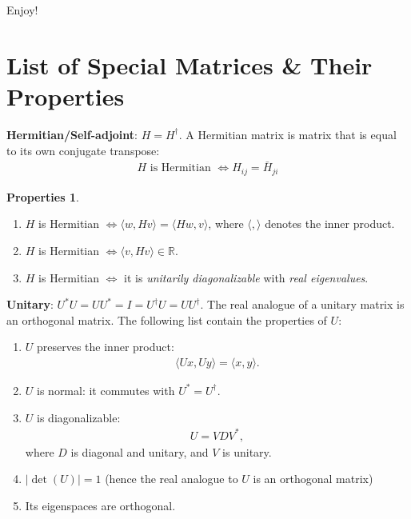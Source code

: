 \documentclass{article}
\theoremstyle{definition}
\newtheorem{prop}{Properties}[section]
\newcommand{\R}{\mathbb{R}}
\begin{document}
Enjoy!


\newpage
\tableofcontents
\newpage

\section{List of Special Matrices \& Their Properties}
\begin{enumerate}
	\item \textbf{Hermitian/Self-adjoint}: $H = H^\dagger$. A Hermitian matrix is matrix that is equal to its own conjugate transpose:
	\begin{align*}
	H \text{ is Hermitian } \iff H_{ij} = \bar{H}_{ji}
	\end{align*} 
	\begin{prop}
	$\,$
	\begin{enumerate}
		\item $H$ is Hermitian $ \iff \langle w, Hv\rangle = \langle Hw, v \rangle$, where $\langle, \rangle$ denotes the inner product.
		\item $H$ is Hermitian $ \iff \langle v, Hv\rangle \in \R$.
		\item $H$ is Hermitian $\iff$ it is \textit{unitarily diagonalizable} with \textit{real eigenvalues}.
	\end{enumerate}
	\item \textbf{Unitary}: $U^*U = UU^* = I = U^\dagger U = UU^\dagger$. The real analogue of a unitary matrix is an orthogonal matrix. The following list contain the properties of $U$:
	\begin{enumerate}
		\item $U$ preserves the inner product:
		\begin{align*}
		\langle Ux, Uy \rangle = \langle x,y\rangle.
		\end{align*}
		
		\item $U$ is normal: it commutes with $U^* = U^\dagger$.
		
		\item $U$ is diagonalizable:
		\begin{align*}
		U = VDV^*,
		\end{align*}
		where $D$ is diagonal and unitary, and $V$ is unitary.
		
		\item $\vert \det(U) \vert = 1 $ (hence the real analogue to $U$ is an orthogonal matrix)
		
		\item Its eigenspaces are orthogonal.
		

\end{enumerate}
\end{prop}
\end{enumerate}
\end{document}
